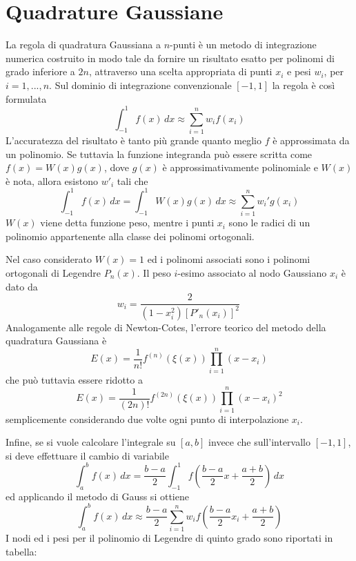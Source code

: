 \section{Quadrature Gaussiane}
La regola di quadratura Gaussiana a $n$-punti è un metodo di integrazione numerica costruito in modo tale da fornire un risultato esatto per polinomi di grado inferiore a $2n$, attraverso una scelta appropriata di punti $x_i$ e pesi $w_i$, per $i=1,...,n$. Sul dominio di integrazione convenzionale $[-1,1]$ la regola è così formulata
$$\int_{-1}^1 f(x)\,dx \approx \sum_{i=1}^n w_i f(x_i)$$
L'accuratezza del risultato è tanto più grande quanto meglio $f$ è approssimata da un polinomio. Se tuttavia la funzione integranda può essere scritta come $f(x)=W(x)g(x)$, dove $g(x)$ è approssimativamente polinomiale e $W(x)$ è nota, allora esistono $w'_i$ tali che
$$\int_{-1}^1 f(x)\,dx = \int_{-1}^1 W(x) g(x)\,dx \approx \sum_{i=1}^n w_i' g(x_i)$$
$W(x)$ viene detta funzione peso, mentre i punti $x_i$ sono le radici di un polinomio appartenente alla classe dei polinomi ortogonali.

Nel caso considerato $W(x)=1$ ed i polinomi associati sono i polinomi ortogonali di Legendre $P_n(x)$. Il peso $i$-esimo associato al nodo Gaussiano $x_i$ è dato da
$$ w_i = \frac{2}{\left( 1-x_i^2 \right) [P'_n(x_i)]^2} \,\!$$
Analogamente alle regole di Newton-Cotes, l'errore teorico del metodo della quadratura Gaussiana è
$$E(x)=\frac{1}{n!}f^{(n)}(\xi(x))\prod_{i=1}^n(x-x_i)$$
che può tuttavia essere ridotto a
$$E(x)=\frac{1}{(2n)!}f^{(2n)}(\xi(x))\prod_{i=1}^n(x-x_i)^2$$
semplicemente considerando due volte ogni punto di interpolazione $x_i$.

Infine, se si vuole calcolare l'integrale su $[a,b]$ invece che sull'intervallo $[-1,1]$, si deve effettuare il cambio di variabile
$$\int_a^b f(x)\,dx = \frac{b-a}{2} \int_{-1}^1 f\left(\frac{b-a}{2}x + \frac{a+b}{2}\right)\,dx $$
ed applicando il metodo di Gauss si ottiene
$$\int_a^b f(x)\,dx \approx \frac{b-a}{2} \sum_{i=1}^n w_i f\left(\frac{b-a}{2}x_i + \frac{a+b}{2}\right)$$
I nodi ed i pesi per il polinomio di Legendre di quinto grado sono riportati in tabella:\\
\begin{center}
\end{center}

